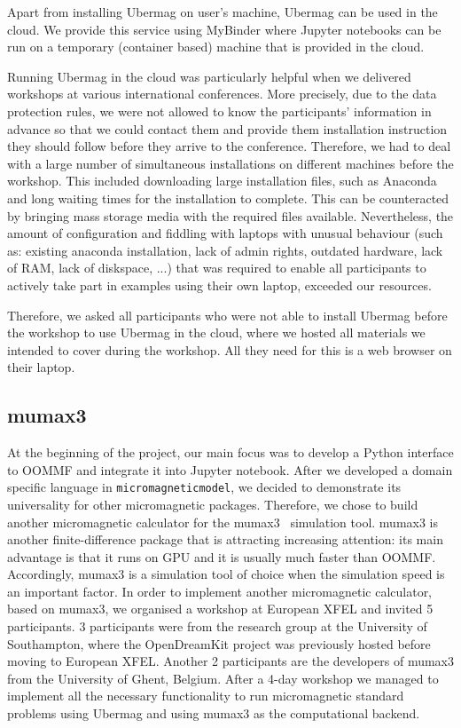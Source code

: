 \documentclass{deliverablereport}
\begin{document}
Apart from installing Ubermag on user's machine, Ubermag can be used
in the cloud. We provide this service using MyBinder where Jupyter
notebooks can be run on a temporary (container based) machine that is
provided in the cloud.

Running Ubermag in the cloud was particularly helpful when we
delivered workshops at various international conferences. More
precisely, due to the data protection rules, we were not allowed to
know the participants' information in advance so that we could contact
them and provide them installation instruction they should follow
before they arrive to the conference. Therefore, we had to deal with a
large number of simultaneous installations on different machines
before the workshop. This included downloading large installation
files, such as Anaconda and long waiting times for the installation to
complete. This can be counteracted by bringing mass storage media with
the required files available. Nevertheless, the amount of
configuration and fiddling with laptops with unusual behaviour (such
as: existing anaconda installation, lack of admin rights, outdated
hardware, lack of RAM, lack of diskspace, ...) that was required to
enable all participants to actively take part in examples using their
own laptop, exceeded our resources.

Therefore, we asked all participants who were not able to
install Ubermag before the workshop to use Ubermag in the cloud, where
we hosted all materials we intended to cover during the workshop. All
they need for this is a web browser on their laptop.

\subsection{mumax3}

At the beginning of the project, our main focus was to develop a
Python interface to OOMMF and integrate it into Jupyter
notebook. After we developed a domain specific language in
\texttt{micromagneticmodel}, we decided to demonstrate its
universality for other micromagnetic packages. Therefore, we chose to
build another micromagnetic calculator for the
mumax3~\cite{Vansteenkiste2014} simulation tool. mumax3 is another
finite-difference package that is attracting increasing attention: its
main advantage is that it runs on GPU and it is usually much faster
than OOMMF. Accordingly, mumax3 is a simulation tool of choice when
the simulation speed is an important factor. In order to implement
another micromagnetic calculator, based on mumax3, we organised a
workshop at European XFEL and invited 5 participants. 3 participants
were from the research group at the University of Southampton, where
the OpenDreamKit project was previously hosted before moving to
European XFEL. Another 2 participants are the developers of mumax3
from the University of Ghent, Belgium. After a 4-day workshop we
managed to implement all the necessary functionality to run
micromagnetic standard problems using Ubermag and using mumax3 as the
computational backend.
\end{document}
